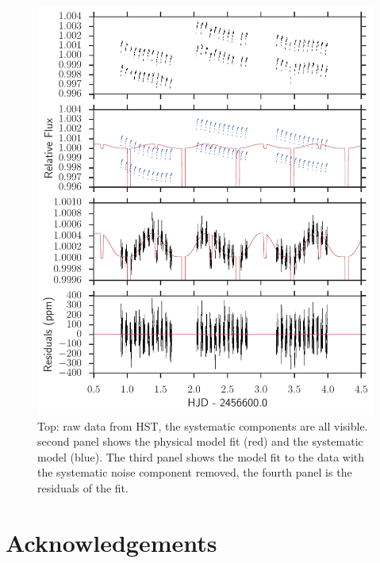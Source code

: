 \documentclass[a4paper,fleqn,usenatbib]{mnras}
\begin{document}
\begin{figure}
\begin{center}
\includegraphics[width=1.0\textwidth]{img/systematics.pdf}
\caption{Top: raw data from HST, the systematic components are all visible. second panel shows the physical model fit (red) and the systematic model (blue). The third panel shows the model fit to the data with the systematic noise component removed, the fourth panel is the residuals of the fit.
}
\label{fig:systematics}
\end{center}
\end{figure}


\section*{Acknowledgements}
\end{document}
